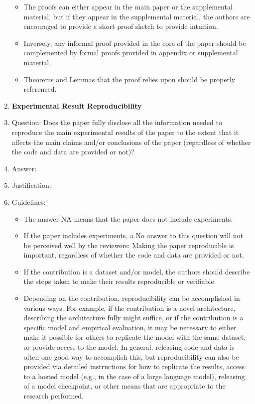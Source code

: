 \documentclass{article}
\begin{document}
\begin{enumerate}
\begin{itemize}
            \item The proofs can either appear in the main paper or the supplemental material, but if they appear in the supplemental material, the authors are encouraged to provide a short proof sketch to provide intuition.
            \item Inversely, any informal proof provided in the core of the paper should be complemented by formal proofs provided in appendix or supplemental material.
            \item Theorems and Lemmas that the proof relies upon should be properly referenced.
        \end{itemize}
    \item {\bf Experimental Result Reproducibility}
    \item[] Question: Does the paper fully disclose all the information needed to reproduce the main experimental results of the paper to the extent that it affects the main claims and/or conclusions of the paper (regardless of whether the code and data are provided or not)?
    \item[] Answer: \answerTODO{} %
    \item[] Justification: \justificationTODO{}
    \item[] Guidelines:
        \begin{itemize}
            \item The answer NA means that the paper does not include experiments.
            \item If the paper includes experiments, a No answer to this question will not be perceived well by the reviewers: Making the paper reproducible is important, regardless of whether the code and data are provided or not.
            \item If the contribution is a dataset and/or model, the authors should describe the steps taken to make their results reproducible or verifiable.
            \item Depending on the contribution, reproducibility can be accomplished in various ways. For example, if the contribution is a novel architecture, describing the architecture fully might suffice, or if the contribution is a specific model and empirical evaluation, it may be necessary to either make it possible for others to replicate the model with the same dataset, or provide access to the model. In general. releasing code and data is often one good way to accomplish this, but reproducibility can also be provided via detailed instructions for how to replicate the results, access to a hosted model (e.g., in the case of a large language model), releasing of a model checkpoint, or other means that are appropriate to the research performed.

\end{itemize}
\end{enumerate}
\end{document}
